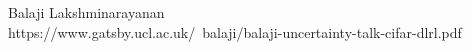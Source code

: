 \documentclass[preview]{standalone}
\begin{document}
\begin{center}
Balaji Lakshminarayanan \\https://www.gatsby.ucl.ac.uk/~balaji/balaji-uncertainty-talk-cifar-dlrl.pdf
\end{center}
\end{document}
